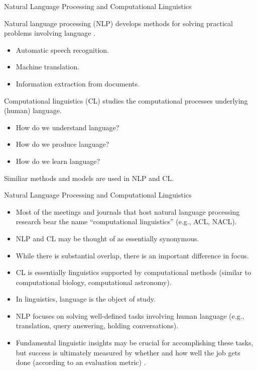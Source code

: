 \documentclass[handout]{beamer}
\begin{document}
\begin{frame}{Natural Language Processing and Computational Linguistics}
\begin{scriptsize}
Natural language processing (NLP) develops methods for solving practical problems involving language \cite{JohnsonMLSS}. \\


\begin{itemize}
\item Automatic speech recognition.
\item Machine translation.
\item Information extraction from documents.
\end{itemize}

Computational linguistics (CL) studies the computational processes underlying (human) language.

\begin{itemize}
 \item How do we understand language?
 \item How do we produce language?
 \item How do we learn language?
\end{itemize}

Similiar methods and models are used in NLP and CL.
\end{scriptsize}
\end{frame}


\begin{frame}{Natural Language Processing and Computational Linguistics}
\begin{scriptsize}
\begin{itemize}
 \item Most of the meetings and journals that host natural language processing research bear the name ``computational linguistics'' (e.g., ACL, NACL). \cite{jacobbook}
 \item NLP and CL may be thought of as essentially synonymous.
 \item While there is substantial overlap, there is an important difference in focus.
 \item CL is essentially linguistics supported by computational methods (similar to computational biology, computational astronomy).
 \item In linguistics, language is the object of study.
 \item NLP focuses on solving well-defined tasks involving human language (e.g., translation, query answering, holding conversations).
 \item Fundamental linguistic insights may be crucial for accomplishing these tasks, but success is ultimately measured by whether and how well the job gets done (according to an evaluation metric) \cite{jacobbook}.
\end{itemize}


\end{scriptsize}
\end{frame}
\end{document}
